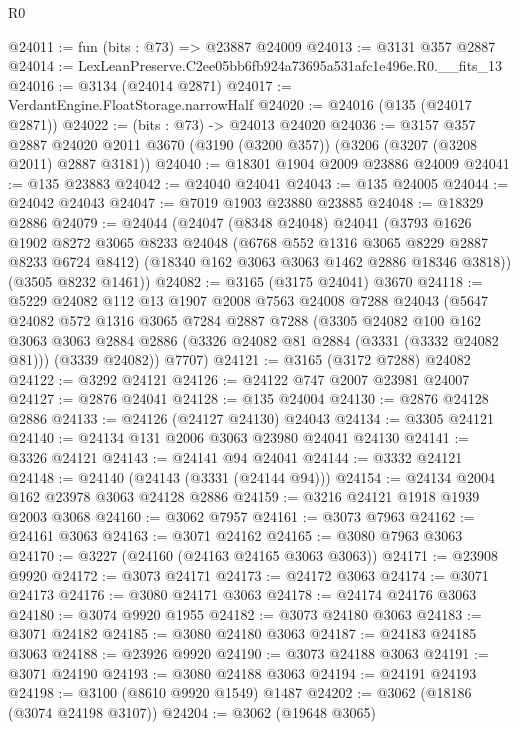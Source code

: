 \begin{lexlean}{R0}
\begin{coremodule}
@24011 := fun (bits : @73) => @23887 @24009
@24013 := @3131 @357 @2887
@24014 := LexLeanPreserve.C2ee05bb6fb924a73695a531afc1e496e.R0.__fits_13
@24016 := @3134 (@24014 @2871)
@24017 := VerdantEngine.FloatStorage.narrowHalf
@24020 := @24016 (@135 (@24017 @2871))
@24022 := (bits : @73) -> @24013 @24020
@24036 := @3157
    @357
    @2887
    @24020
    @2011
    @3670
    (@3190 (@3200 @357))
    (@3206 (@3207 (@3208 @2011) @2887 @3181))
@24040 := @18301 @1904 @2009 @23886 @24009
@24041 := @135 @23883
@24042 := @24040 @24041
@24043 := @135 @24005
@24044 := @24042 @24043
@24047 := @7019 @1903 @23880 @23885
@24048 := @18329 @2886
@24079 := @24044
    (@24047
      (@8348 @24048)
      @24041
      (@3793
        @1626
        @1902
        @8272
        @3065
        @8233
        @24048
        (@6768 @552 @1316 @3065 @8229 @2887 @8233 @6724 @8412)
        (@18340 @162 @3063 @3063 @1462 @2886 @18346 @3818))
      (@3505 @8232 @1461))
@24082 := @3165 (@3175 @24041) @3670
@24118 := @5229
    @24082
    @112
    @13
    @1907
    @2008
    @7563
    @24008
    @7288
    @24043
    (@5647
      @24082
      @572
      @1316
      @3065
      @7284
      @2887
      @7288
      (@3305
        @24082
        @100
        @162
        @3063
        @3063
        @2884
        @2886
        (@3326 @24082 @81 @2884 (@3331 (@3332 @24082 @81)))
        (@3339 @24082))
      @7707)
@24121 := @3165 (@3172 @7288) @24082
@24122 := @3292 @24121
@24126 := @24122 @747 @2007 @23981 @24007
@24127 := @2876 @24041
@24128 := @135 @24004
@24130 := @2876 @24128 @2886
@24133 := @24126 (@24127 @24130) @24043
@24134 := @3305 @24121
@24140 := @24134 @131 @2006 @3063 @23980 @24041 @24130
@24141 := @3326 @24121
@24143 := @24141 @94 @24041
@24144 := @3332 @24121
@24148 := @24140 (@24143 (@3331 (@24144 @94)))
@24154 := @24134 @2004 @162 @23978 @3063 @24128 @2886
@24159 := @3216 @24121 @1918 @1939 @2003 @3068
@24160 := @3062 @7957
@24161 := @3073 @7963
@24162 := @24161 @3063
@24163 := @3071 @24162
@24165 := @3080 @7963 @3063
@24170 := @3227 (@24160 (@24163 @24165 @3063 @3063))
@24171 := @23908 @9920
@24172 := @3073 @24171
@24173 := @24172 @3063
@24174 := @3071 @24173
@24176 := @3080 @24171 @3063
@24178 := @24174 @24176 @3063
@24180 := @3074 @9920 @1955
@24182 := @3073 @24180 @3063
@24183 := @3071 @24182
@24185 := @3080 @24180 @3063
@24187 := @24183 @24185 @3063
@24188 := @23926 @9920
@24190 := @3073 @24188 @3063
@24191 := @3071 @24190
@24193 := @3080 @24188 @3063
@24194 := @24191 @24193
@24198 := @3100 (@8610 @9920 @1549) @1487
@24202 := @3062 (@18186 (@3074 @24198 @3107))
@24204 := @3062 (@19648 @3065)

\end{coremodule}
\end{lexlean}
